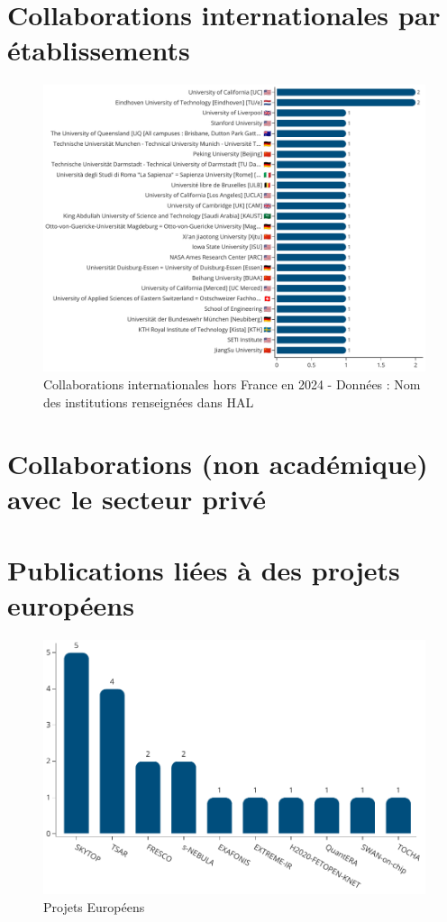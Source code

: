 \documentclass[french, 11pt]{../../dibiso/biso}
\begin{document}
\pagebreak

\section{Collaborations internationales par établissements}

\begin{figure}[!h]
  \includegraphics[width=\textwidth]{figures/international_collaborations.pdf}
  \caption{Collaborations internationales hors France en 2024 - Données : Nom des institutions renseignées dans HAL}
  \label{fig_collab_names}
\end{figure}

\pagebreak

\section{Collaborations (non académique) avec le secteur privé}


\pagebreak

\section{Publications liées à des projets européens}

\begin{figure}[!h]
  \includegraphics[width=.8\textwidth]{figures/eu_projects.pdf}
  \centering
  \caption{Projets Européens}
  \label{fig_eu_projects}
\end{figure}
\end{document}
